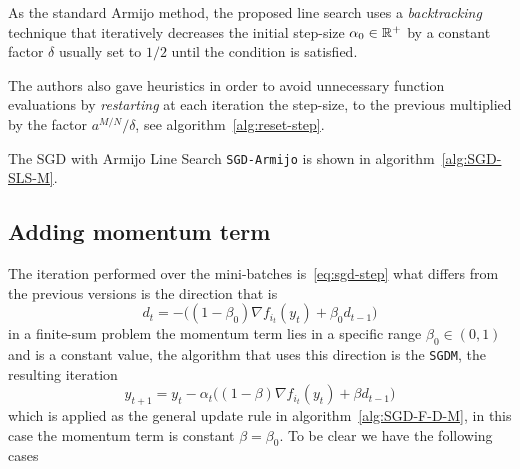 As the standard Armijo method, the proposed line search uses a \emph{backtracking} technique that iteratively decreases the initial step-size $\alpha_0\in\mathbb{R}^+$ by a constant factor $\delta$ usually set to $1/2$ until the condition is satisfied.

The authors also gave heuristics in order to avoid unnecessary function evaluations by \emph{restarting} at each iteration the step-size, to the previous multiplied by the factor $a^{M/N}/\delta$, see algorithm~\vref{alg:reset-step}.

The SGD with Armijo Line Search \texttt{SGD-Armijo} is shown in algorithm~\vref{alg:SGD-SLS-M}.

\subsection{Adding momentum term}\label{subsc:sgdm}

The iteration performed over the mini-batches is~\eqref{eq:sgd-step} what differs from the previous versions is the direction that is
\[
d_t=-\bigl((1-\beta_0)\nabla f_{i_t}(y_t)+\beta_0d_{t-1}\bigr)
\]
in a finite-sum problem the momentum term lies in a specific range $\beta_0\in(0,1)$ and is a constant value, the algorithm that uses this direction is the \texttt{SGDM}, the resulting iteration
\begin{equation}\label{eq:sgdm-step}
y_{t+1}=y_t-\alpha_t\bigl((1-\beta)\nabla f_{i_t}(y_t)+\beta d_{t-1}\bigr)
\end{equation}
which is applied as the general update rule in algorithm~\vref{alg:SGD-F-D-M}, in this case the momentum term is constant $\beta=\beta_0$. To be clear we have the following cases
\begin{center}
\end{center}

